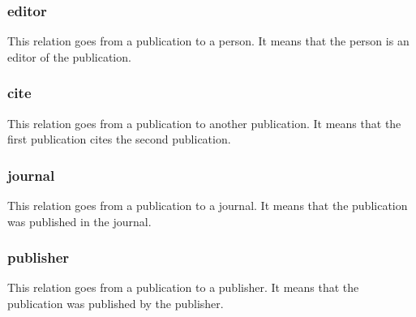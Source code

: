 \documentclass{article}
\begin{document}
\subsubsection{editor}
This relation goes from a publication to a person. It means that the person is an editor of the publication.

\begin{center}
\end{center}

\subsubsection{cite}
This relation goes from a publication to another publication. It means that the first publication cites the second publication.

\begin{center}
\end{center}

\subsubsection{journal}
This relation goes from a publication to a journal. It means that the publication was published in the journal.

\begin{center}
\end{center}

\subsubsection{publisher}
This relation goes from a publication to a publisher. It means that the publication was published by the publisher.
\end{document}
